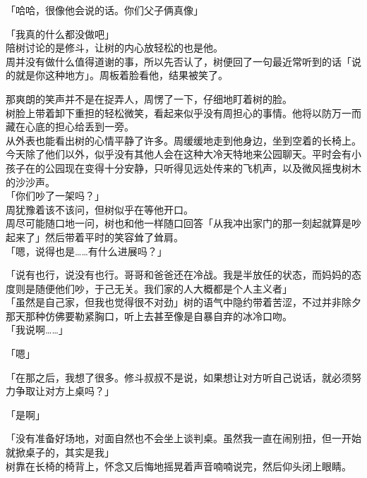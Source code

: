「哈哈，很像他会说的话。你们父子俩真像」

「我真的什么都没做吧」\\

陪树讨论的是修斗，让树的内心放轻松的也是他。\\

周并没有做什么值得道谢的事，所以先否认了，树便回了一句最近常听到的话「说的就是你这种地方」。周板着脸看他，结果被笑了。

那爽朗的笑声并不是在捉弄人，周愣了一下，仔细地盯着树的脸。\\

树脸上带着卸下重担的轻松微笑，看起来似乎没有周担心的事情。他将以防万一而藏在心底的担心给丢到一旁。\\

从外表也能看出树的心情平静了许多。周缓缓地走到他身边，坐到空着的长椅上。\\

今天除了他们以外，似乎没有其他人会在这种大冷天特地来公园聊天。平时会有小孩子在的公园现在变得十分安静，只听得见远处传来的飞机声，以及微风摇曳树木的沙沙声。\\

「你们吵了一架吗？」\\

周犹豫着该不该问，但树似乎在等他开口。\\

周尽可能随口地一问，树也和他一样随口回答「从我冲出家门的那一刻起就算是吵起来了」然后带着平时的笑容耸了耸肩。\\

「嗯，说得也是……有什么进展吗？」

「说有也行，说没有也行。哥哥和爸爸还在冷战。我是半放任的状态，而妈妈的态度则是随便他们吵，于己无关。我们家的人大概都是个人主义者」\\

「虽然是自己家，但我也觉得很不对劲」树的语气中隐约带着苦涩，不过并非除夕那天那种仿佛要勒紧胸口，听上去甚至像是自暴自弃的冰冷口吻。\\

「我说啊……」

「嗯」

「在那之后，我想了很多。修斗叔叔不是说，如果想让对方听自己说话，就必须努力争取让对方上桌吗？」

「是啊」

「没有准备好场地，对面自然也不会坐上谈判桌。虽然我一直在闹别扭，但一开始就掀桌子的，其实是我」\\

树靠在长椅的椅背上，怀念又后悔地摇晃着声音喃喃说完，然后仰头闭上眼睛。\\

